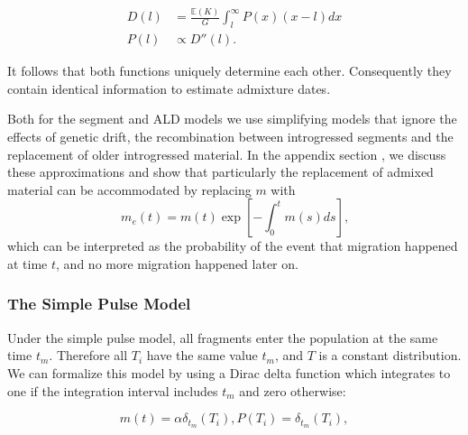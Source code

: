 \documentclass[11pt]{article}
\begin{document}
\begin{align}
D(l) &= \frac{\mathbb{E}(K)}{G} \int_l^\infty P(x) (x-l) d x\\
P(l)  &\propto D''(l).
\end{align}

It follows that both functions uniquely determine each other. Consequently they contain identical information to estimate admixture dates.

Both for the segment and ALD models we use simplifying models that ignore the effects of genetic drift,  the recombination between introgressed segments and the replacement of older introgressed material. In the appendix section \textbf{}, we discuss these approximations and show that particularly the replacement of admixed material can be accommodated by replacing $m$ with
\begin{equation}
    m_e(t) = m(t)\exp\left[-\int_0^t m(s)ds\right] \text{,} \label{eq:effective_migration}
\end{equation}
which can be interpreted as the probability of the event that migration happened at time $t$, and no more migration happened later on.




\subsubsection{The Simple Pulse Model}\label{The Simple Pulse Model}
	
	
Under the simple pulse model, all fragments enter the population at the same time $t_m$. Therefore all $T_i$ have the same value $t_m$, and $T$ is a constant distribution. We can formalize this model by using a Dirac delta function which integrates to one if the integration interval includes $t_m$ and zero otherwise:

\begin{subequations}
\begin{equation}
\label{eq:RV_simple_pulse_1}
	m(t)=  \alpha \delta_{t_m}(T_i),
\end{equation} 
	
\begin{equation}
\label{eq:RV_simple_pulse_2}
	P(T_i)=\delta_{t_m}(T_i),
\end{equation} 
\end{subequations}
\end{document}
